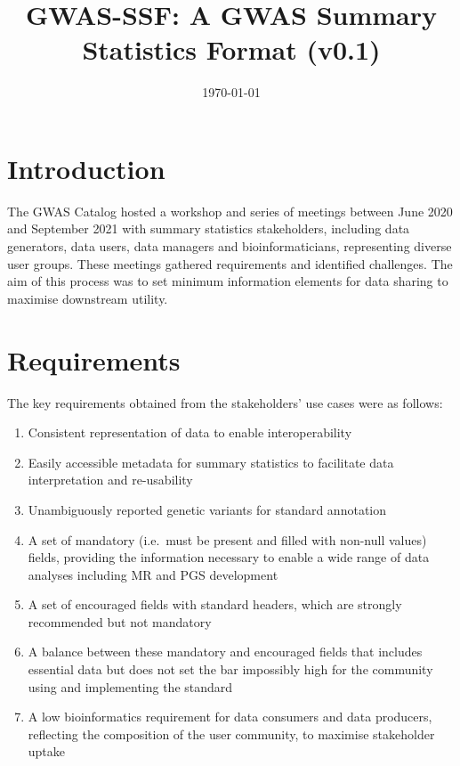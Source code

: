 \documentclass[11pt]{article}
\title{GWAS-SSF: A GWAS Summary Statistics Format (v0.1)}
\date{\today}
\begin{document}
\maketitle

\newpage
\tableofcontents

\newpage

\section{Introduction}
The GWAS Catalog hosted a workshop and series of meetings between June 2020 and September 2021 with summary statistics stakeholders, including data generators, data users, data managers and bioinformaticians, representing diverse user groups. These meetings gathered requirements and identified challenges. The aim of this process was to set minimum information elements for data sharing to maximise downstream utility.

\section{Requirements}

The key requirements obtained from the stakeholders’ use cases were as follows:

\begin{enumerate}
\item Consistent representation of data to enable interoperability
\item Easily accessible metadata for summary statistics to facilitate data interpretation and re-usability
\item Unambiguously reported genetic variants for standard annotation
\item A set of mandatory (i.e.\ must be present and filled with non-null values) fields, providing the information necessary to enable a wide range of data analyses including MR and PGS development
\item A set of encouraged fields with standard headers, which are strongly recommended but not mandatory 
\item A balance between these mandatory and encouraged fields that includes essential data but does not set the bar impossibly high for the community using and implementing the standard
\item A low bioinformatics requirement for data consumers and data producers, reflecting the composition of the user community, to maximise stakeholder uptake 
\end{enumerate}
\end{document}

